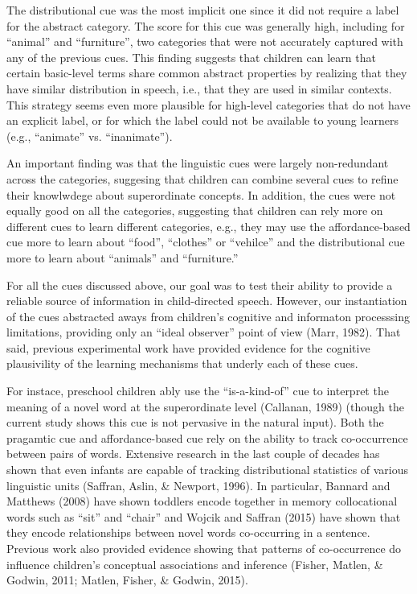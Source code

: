 \documentclass[english,,man,floatsintext]{apa6}
\begin{document}
The distributional cue was the most implicit one since it did not require a label for the abstract category. The score for this cue was generally high, including for \enquote{animal} and \enquote{furniture}, two categories that were not accurately captured with any of the previous
cues. This finding suggests that children can learn that certain basic-level terms share common abstract properties by realizing that they have similar distribution in speech, i.e., that they are used in similar contexts. This strategy seems even more plausible for high-level categories that do not have an explicit label, or for which the label could not be available to young learners (e.g., \enquote{animate} vs. \enquote{inanimate}).

An important finding was that the linguistic cues were largely non-redundant across the categories, suggesing that children can combine several cues to refine their knowlwdege about superordinate concepts. In addition, the cues were not equally good on all the categories, suggesting that children can rely more on different cues to learn different categories, e.g., they may use the affordance-based cue more to learn about \enquote{food}, \enquote{clothes} or \enquote{vehilce} and the distributional cue more to learn about \enquote{animals} and \enquote{furniture.}

For all the cues discussed above, our goal was to test their ability to provide a reliable source of information in child-directed speech. However, our instantiation of the cues abstracted aways from children's cognitive and informaton processsing limitations, providing only an \enquote{ideal observer} point of view (Marr, 1982). That said, previous experimental work have provided evidence for the cognitive plausivility of the learning mechanisms that underly each of these cues.

For instace, preschool children ably use the \enquote{is-a-kind-of} cue to interpret the meaning of a novel word at the superordinate level (Callanan, 1989) (though the current study shows this cue is not pervasive in the natural input). Both the pragamtic cue and affordance-based cue rely on the ability to track co-occurrence between pairs of words. Extensive research in the last couple of decades has shown that even infants are capable of tracking distributional statistics of various linguistic units (Saffran, Aslin, \& Newport, 1996). In particular, Bannard and Matthews (2008) have shown toddlers encode together in memory collocational words such as \enquote{sit} and \enquote{chair} and Wojcik and Saffran (2015) have shown that they encode relationships between novel words co-occurring in a sentence. Previous work also provided evidence showing that patterns of co-occurrence do influence children's conceptual associations and inference (Fisher, Matlen, \& Godwin, 2011; Matlen, Fisher, \& Godwin, 2015).
\end{document}
